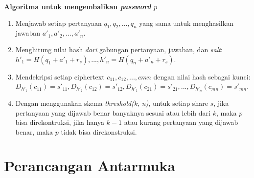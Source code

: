 \begin{flushleft}
	\textbf{Algoritma untuk mengembalikan \textit{password} \begin{math}p\end{math}}
\end{flushleft}

\begin{enumerate}[label={(\arabic*)}]
	\item Menjawab setiap pertanyaan \begin{math}q_1, q_2, ..., q_n\end{math} yang sama untuk menghasilkan jawaban \begin{math}a'_1, a'_2, ..., a'_n\end{math}.
	\item Menghitung nilai hash \textit{dari} gabungan pertanyaan, jawaban, dan \textit{salt}: \begin{math}h'_1 = H(q_1+a'_1+r_s), ..., h'_n = H(q_n+a'_n+r_s)\end{math}.
	\item Mendekripsi setiap ciphertext \begin{math}c_{11}, c_{12}, ..., c{mn}\end{math} dengan nilai hash sebagai kunci: \begin{math}D_{h'_1}(c_{11}) = s'_{11}, D_{h'_2}(c_{12}) = s'_{12}, D_{h'_1}(c_{21}) = s'_{21}, ..., D_{h'_n}(c_{mn}) = s'_{mn}\end{math}.
	\item Dengan menggunakan skema \textit{threshold(k, n)}, untuk setiap share \begin{math}s\end{math}, jika pertanyaan yang dijawab benar banyaknya sesuai atau lebih dari \begin{math}k\end{math}, maka \begin{math}p\end{math} bisa direkontruksi, jika hanya \begin{math}k-1\end{math} atau kurang pertanyaan yang dijawab benar, maka \begin{math}p\end{math} tidak bisa direkonstruksi.
\end{enumerate}

\section{Perancangan Antarmuka}


